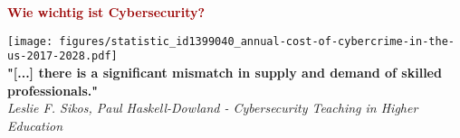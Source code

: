 \begin{frame}[plain]
    \centering
    \LARGE
    \pause
    \textcolor[HTML]{990000}{\textbf{Wie wichtig ist Cybersecurity?}}
\end{frame}

\begin{frame}[plain]
    \centering
    \small
    \texttt{[image: figures/statistic\_id1399040\_annual-cost-of-cybercrime-in-the-us-2017-2028.pdf]}
    \vspace{.6cm}
    \\\textbf{"[...] there is a significant mismatch in supply and demand of skilled professionals."}
    \tiny
    \\\textit{Leslie F. Sikos, Paul Haskell-Dowland - Cybersecurity Teaching in Higher Education}
\end{frame}